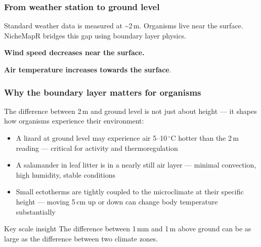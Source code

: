 \documentclass{beamer}
\begin{document}
\begin{frame}
  \frametitle{From weather station to ground level}

  Standard weather data is measured at \textasciitilde2\,m. Organisms live near the surface. NicheMapR bridges this gap using boundary layer physics.

  \vspace{0.2cm}

  \textbf{Wind speed decreases near the surface.}


  \textbf{Air temperature increases towards the surface}.

\end{frame}

\begin{frame}
  \frametitle{Why the boundary layer matters for organisms}

  The difference between 2\,m and ground level is not just about height --- it shapes how organisms experience their environment:

  \vspace{0.2cm}

  \begin{itemize}
    \item A lizard at ground level may experience air 5--10$\,^\circ$C hotter than the 2\,m reading --- critical for activity and thermoregulation
    \item A salamander in leaf litter is in a nearly still air layer --- minimal convection, high humidity, stable conditions
    \item Small ectotherms are tightly coupled to the microclimate at their specific height --- moving 5\,cm up or down can change body temperature substantially
  \end{itemize}

  \vspace{0.2cm}

  \begin{block}{Key scale insight}
    The difference between 1\,mm and 1\,m above ground can be as large as the difference between two climate zones.
  \end{block}
\end{frame}
\end{document}
